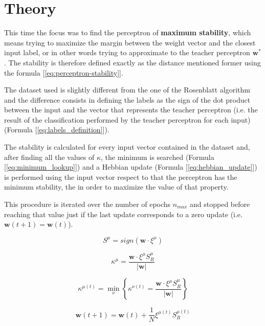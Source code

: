 \section{Theory}
\label{sec:theory}

This time the focus was to find the perceptron of \textbf{maximum stability}, which means trying to maximize the margin between the
weight vector and the closest input label, or in other words trying to approximate to the teacher perceptron $\mathsf{\bm{w}}^*$.
The stability is therefore defined exactly as the distance mentioned former using the formula [\ref{eq:perceptron-stability}].

The dataset used is slightly different from the one of the Rosenblatt algorithm and the difference consists in defining the labels
as the sign of the dot product between the input and the vector that represents the teacher perceptron (i.e. the result of the
classification performed by the teacher perceptron for each input) (Formula [\ref{eq:labels_definition}]). 

The stability is calculated for every input vector contained in the dataset and, after finding all the values of $\kappa$,
the minimum is searched (Formula [\ref{eq:minimum_lookup}]) and a Hebbian update (Formula [\ref{eq:hebbian_update}]) is performed using the input vector
respect to that the perceptron has the minimum stability, the in order to maximize the value of that property.

This procedure is iterated over the number of epochs $n_{max}$ and stopped before reaching that value just if the last update
corresponds to a zero update (i.e. $\mathsf{\bm{w}}(t+1) = \mathsf{\bm{w}}(t)$). 

\begin{equation} \label{eq:labels_definition}
    S^\mu = sign(\mathsf{\bm{w}} \cdotp \xi^\mu)
\end{equation}

\begin{equation} \label{eq:perceptron-stability}
    \kappa^\mu = \frac{\mathsf{\bm{w}} \cdotp \xi^\mu S^\mu_R}{\lvert \mathsf{\bm{w}} \rvert}
\end{equation}

\begin{equation} \label{vminimum_lookup}
    \kappa^{\mu(t)} = \min_\nu \left \{ \kappa^{\nu(t)} =  \frac{\mathsf{\bm{w}} \cdotp \xi^\mu S^\mu_R}{\lvert \mathsf{\bm{w}} \rvert} \right \}
\end{equation}

\begin{equation} \label{eq:hebbian_update}
    \mathsf{\bm{w}}(t+1) = \mathsf{\bm{w}}(t) + \frac{1}{N} \xi^{\mu(t)} S^{\mu(t)}_R
\end{equation}